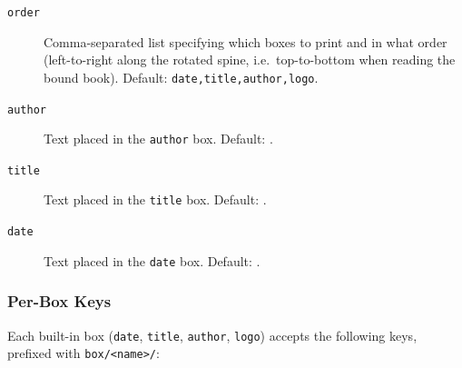 \begin{description}
  \item[\texttt{order}] Comma-separated list specifying which boxes to
    print and in what order (left-to-right along the rotated spine, i.e.\
    top-to-bottom when reading the bound book).
    Default: \texttt{date,title,author,logo}.
\begin{latexcode}
\end{latexcode}

  \item[\texttt{author}] Text placed in the \texttt{author} box.
    Default: \latexinline{\GetDocAuthor(name,short)}.
  \item[\texttt{title}] Text placed in the \texttt{title} box.
    Default: .
  \item[\texttt{date}] Text placed in the \texttt{date} box.
    Default: .
\end{description}

\subsubsection*{Per-Box Keys}

Each built-in box (\texttt{date}, \texttt{title}, \texttt{author},
\texttt{logo}) accepts the following keys, prefixed with
\texttt{box/<name>/}:

